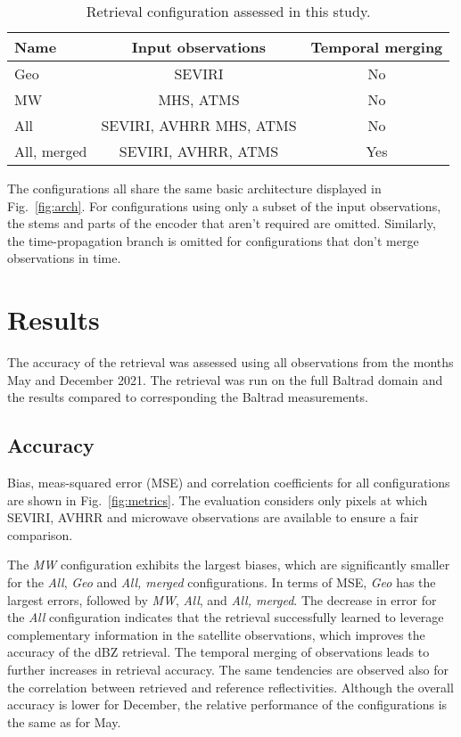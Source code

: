 \documentclass[11pt]{scrartcl}
\begin{document}
\begin{table}[hbpt]
  \begin{tabular}{l|cc}
    Name & Input observations & Temporal merging \\
    \hline
    Geo & SEVIRI & No \\
    MW & MHS, ATMS & No \\
    All & SEVIRI, AVHRR MHS, ATMS & No \\
    All, merged & SEVIRI, AVHRR, ATMS & Yes
  \end{tabular}
  \caption{Retrieval configuration assessed in this study.}
  \label{tab:configurations}
  \end{table}

The configurations all share the same basic architecture displayed in
Fig.~\ref{fig:arch}. For configurations using only a subset of the
input observations, the stems and parts of the encoder that aren't
required are omitted. Similarly, the time-propagation branch is omitted
for configurations that don't merge observations in time.


\section{Results}
\label{sec:results}

The accuracy of the retrieval was assessed using all observations from the months
May and December 2021. The retrieval was run on the full Baltrad domain and the
results compared to corresponding the Baltrad measurements.

\subsection{Accuracy}


Bias, meas-squared error (MSE) and correlation coefficients for all
configurations are shown in Fig.~\ref{fig:metrics}. The evaluation considers
only pixels at which SEVIRI, AVHRR and microwave observations are available to
ensure a fair comparison.

The \textit{MW} configuration exhibits the largest biases, which are
significantly smaller for the \textit{All}, \textit{Geo} and \textit{All,
  merged} configurations. In terms of MSE, \textit{Geo} has the largest errors,
followed by \textit{MW}, \textit{All}, and \textit{All, merged}. The decrease in
error for the \textit{All} configuration indicates that the retrieval
successfully learned to leverage complementary information in the satellite
observations, which improves the accuracy of the dBZ retrieval. The temporal
merging of observations leads to further increases in retrieval accuracy. The
same tendencies are observed also for the correlation between retrieved and
reference reflectivities. Although the overall accuracy is lower for December,
the relative performance of the configurations is the same as for May.
\end{document}
